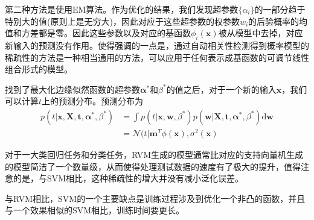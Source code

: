第二种方法是使用EM算法。作为优化的结果，我们发现超参数$\{\alpha_i\}$的一部分趋于特别大的值(原则上是无穷大)，因此对应于这些超参数的权参数$w_i$的后验概率的均值和方差都是零。因此这些参数以及对应的基函数$\phi_i(\boldsymbol{x})$被从模型中去掉，对应新输入的预测没有作用。使得强调的一点是，通过自动相关性检测得到概率模型的稀疏性的方法是一种相当通用的方法，可以应用于任何表示成基函数的可调节线性组合形式的模型。

找到了最大化边缘似然函数的超参数$\boldsymbol{\alpha}^*$和$\beta^*$的值之后，对于一个新的输入$\boldsymbol{x}$，我们可以计算$t$上的预测分布。预测分布为
\begin{equation}
	\begin{aligned}
		p(t|\boldsymbol{x},\boldsymbol{X},\boldsymbol{t},\boldsymbol{\alpha}^*,\beta^*)&=\int p(t|\boldsymbol{x},\boldsymbol{w},\beta^*)p(\boldsymbol{w}|\boldsymbol{X},\boldsymbol{t},\boldsymbol{\alpha}^*,\beta^*)\mathrm{d}\boldsymbol{w}\\
		&=\mathcal{N}(t|\boldsymbol{m}^T\phi(\boldsymbol{x}),\sigma^2(\boldsymbol{x})
	\end{aligned}
\end{equation}

对于一大类回归任务和分类任务，RVM生成的模型通常比对应的支持向量机生成的模型简洁了一个数量级，从而使得处理测试数据的速度有了极大的提升，值得注意的是，与SVM相比，这种稀疏性的增大并没有减小泛化误差。

与RVM相比，SVM的一个主要缺点是训练过程涉及到优化一个非凸的函数，并且与一个效果相似的SVM相比，训练时间要更长。
